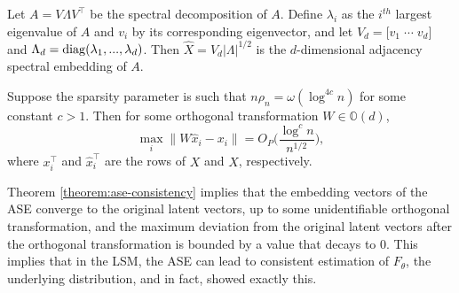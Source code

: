 \documentclass[12pt]{article}
\begin{document}
\begin{definition}
\label{def:ase}
Let $A = V \Lambda V^\top$ be the spectral decomposition of $A$. 
Define $\lambda_i$ as the $i^{th}$ largest eigenvalue of $A$ and $v_i$ by its corresponding eigenvector, and let $V_d = \bigl[ v_1 \; \cdots \; v_d \bigr]$ and $\Lambda_d = \mathrm{diag}(\lambda_1, ..., \lambda_d)$. 
Then $\hat{X} = V_d |\Lambda|^{1/2}$ is the $d$-dimensional adjacency spectral embedding of $A$. 
\end{definition}

\begin{theorem}
\label{theorem:ase-consistency}
Suppose the sparsity parameter is such that $n \rho_n = \omega (\log^{4 c} n)$ for some constant $c > 1$. 
Then for some orthogonal transformation $W \in \mathbb{O}(d)$, 
$$\max_i \|W \hat{x}_i - x_i \| = O_P \bigg( \frac{\log^c n}{n^{1/2}} \bigg),$$
where $x_i^\top$ and $\hat{x}_i^\top$ are the rows of $X$ and $\hat{X}$, respectively. 
\end{theorem}

Theorem \ref{theorem:ase-consistency} implies that the embedding vectors
of the ASE converge to the original latent vectors, up to some
unidentifiable orthogonal transformation, and the maximum deviation from
the original latent vectors after the orthogonal transformation is
bounded by a value that decays to \(0\). This implies that in the LSM,
the ASE can lead to consistent estimation of \(F_\theta\), the
underlying distribution, and in fact, \citet{athreya2020estimation}
showed exactly this.
\end{document}
